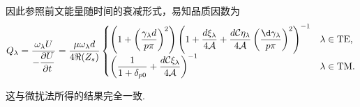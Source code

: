 \begin{notes}
	因此参照前文能量随时间的衰减形式，易知品质因数为
	\begin{equation*}
		Q_\lambda = \dfrac{\omega_\lambda U}{- \dfrac{\partial U}{\partial t} } = \dfrac{\mu \omega_\lambda d}{4 \Re(Z_s)}
		\begin{cases}
			\left( 1 + \left( \dfrac{\gamma_\lambda d}{p\pi} \right)^2 \right) \left( 1 + \dfrac{d \xi_\lambda}{4 \mathcal{A}} + \dfrac{d \mathcal{C} \eta_\lambda}{4 \mathcal{A}} \left( \dfrac{\d \gamma_\lambda}{p\pi} \right)^2 \right)^{-1} & \lambda \in \text{TE}, \\[8pt]
			\left( \dfrac{1}{1 + \delta_{p0}} + \dfrac{d \mathcal{C} \xi_\lambda}{4 \mathcal{A}} \right)^{-1}                                                                                                                                    & \lambda \in \text{TM}.
		\end{cases}
	\end{equation*}

	这与微扰法所得的结果完全一致.
\end{notes}

